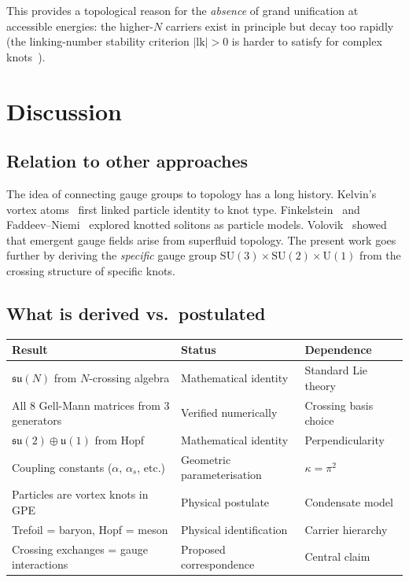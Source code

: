 \documentclass[11pt,a4paper]{article}
\begin{document}
This provides a topological reason for the \emph{absence} of
grand unification at accessible energies: the higher-$N$ carriers
exist in principle but decay too rapidly (the linking-number
stability criterion $|\mathrm{lk}| > 0$ is harder to satisfy for
complex knots~\cite{paper8_old}).


\section{Discussion}
\label{sec:discussion}

\subsection{Relation to other approaches}

The idea of connecting gauge groups to topology has a long
history.  Kelvin's vortex atoms~\cite{Thomson1867} first linked
particle identity to knot type.  Finkelstein~\cite{Finkelstein1989}
and Faddeev--Niemi~\cite{FaddeevNiemi1997} explored knotted
solitons as particle models.  Volovik~\cite{Volovik2003} showed
that emergent gauge fields arise from superfluid topology.
The present work goes further by deriving the \emph{specific}
gauge group $\mathrm{SU}(3) \times \mathrm{SU}(2) \times
\mathrm{U}(1)$ from the crossing structure of specific knots.

\subsection{What is derived vs.\ postulated}

\begin{center}
\begin{tabular}{lll}
\toprule
Result & Status & Dependence \\
\midrule
$\mathfrak{su}(N)$ from $N$-crossing algebra &
  Mathematical identity & Standard Lie theory \\
All 8 Gell-Mann matrices from 3 generators &
  Verified numerically & Crossing basis choice \\
$\mathfrak{su}(2) \oplus \mathfrak{u}(1)$ from Hopf &
  Mathematical identity & Perpendicularity \\
Coupling constants ($\alpha$, $\alpha_s$, etc.) &
  Geometric parameterisation & $\kappa = \pi^2$ \\
\midrule
Particles are vortex knots in GPE &
  Physical postulate & Condensate model \\
Trefoil = baryon, Hopf = meson &
  Physical identification & Carrier hierarchy \\
Crossing exchanges = gauge interactions &
  Proposed correspondence & Central claim \\
\bottomrule
\end{tabular}
\end{center}
\end{document}
